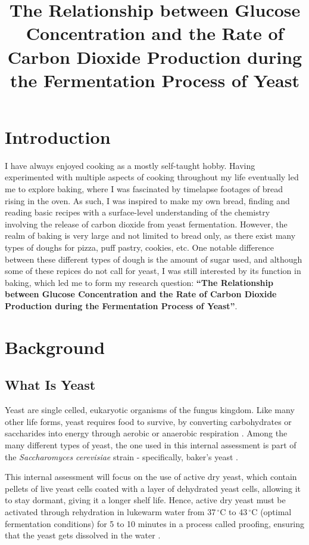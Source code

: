 \documentclass{article}
\title{\textbf{The Relationship between Glucose Concentration and the Rate of Carbon Dioxide Production during the Fermentation Process of Yeast}}
\author{}
\date{}
\begin{document}
\maketitle
\newpage
{}

\section{Introduction}
I have always enjoyed cooking as a mostly self-taught hobby. Having experimented with multiple aspects of cooking throughout my life eventually led me to explore baking, where I was fascinated by timelapse footages of bread rising in the oven. As such, I was inspired to make my own bread, finding and reading basic recipes with a surface-level understanding of the chemistry involving the release of carbon dioxide from yeast fermentation. However, the realm of baking is very large and not limited to bread only, as there exist many types of doughs for pizza, puff pastry, cookies, etc. One notable difference between these different types of dough is the amount of sugar used, and although some of these repices do not call for yeast, I was still interested by its function in baking, which led me to form my research question: \textbf{``The Relationship between Glucose Concentration and the Rate of Carbon Dioxide Production during the Fermentation Process of Yeast''}.

\section{Background}

\subsection{What Is Yeast}
Yeast are single celled, eukaryotic organisms of the fungus kingdom. Like many other life forms, yeast requires food to survive, by converting carbohydrates or saccharides into energy through aerobic or anaerobic respiration \parencite{ref}. Among the many different types of yeast, the one used in this internal assessment is part of the \emph{Saccharomyces cerevisiae} strain - specifically, baker's yeast \parencite{ref}.

\medskip

This internal assessment will focus on the use of active dry yeast, which contain pellets of live yeast cells coated with a layer of dehydrated yeast cells, \parencite{ref} allowing it to stay dormant, giving it a longer shelf life. Hence, active dry yeast must be activated through rehydration in lukewarm water from 37$\,^{\circ}$C to 43$\,^{\circ}$C (optimal fermentation conditions) for 5 to 10 minutes in a process called proofing, ensuring that the yeast gets dissolved in the water \parencite{ref}.
\end{document}
